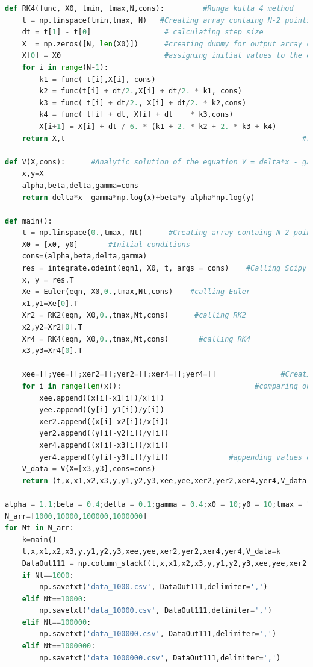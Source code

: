 \documentclass[12pt]{article}
\begin{document}
\begin{lstlisting}[language=Python, caption=Python example]
def RK4(func, X0, tmin, tmax,N,cons):         #Runga kutta 4 method
    t = np.linspace(tmin,tmax, N)   #Creating array containg N-2 points between tmin and tmax (Basically calculation points)
    dt = t[1] - t[0]                 # calculating step size
    X  = np.zeros([N, len(X0)])      #creating dummy for output array containing x,y values
    X[0] = X0                        #assigning initial values to the output array
    for i in range(N-1):
        k1 = func( t[i],X[i], cons)
        k2 = func(t[i] + dt/2.,X[i] + dt/2. * k1, cons)
        k3 = func( t[i] + dt/2., X[i] + dt/2. * k2,cons)
        k4 = func( t[i] + dt, X[i] + dt    * k3,cons)
        X[i+1] = X[i] + dt / 6. * (k1 + 2. * k2 + 2. * k3 + k4)           #Updating values of the dummy array that we created 
    return X,t                                                       #returns array of updated values of X and array t

def V(X,cons):      #Analytic solution of the equation V = delta*x - gamma*ln(x)+beta*y-alpha*ln(y)   
    x,y=X
    alpha,beta,delta,gamma=cons
    return delta*x -gamma*np.log(x)+beta*y-alpha*np.log(y)

def main():
    t = np.linspace(0.,tmax, Nt)      #Creating array containg N-2 points between tmin and tmax (Basically calculation points)
    X0 = [x0, y0]       #Initial conditions
    cons=(alpha,beta,delta,gamma)
    res = integrate.odeint(eqn1, X0, t, args = cons)    #Calling Scipy's odeint function
    x, y = res.T
    Xe = Euler(eqn, X0,0.,tmax,Nt,cons)    #calling Euler
    x1,y1=Xe[0].T
    Xr2 = RK2(eqn, X0,0.,tmax,Nt,cons)      #calling RK2
    x2,y2=Xr2[0].T
    Xr4 = RK4(eqn, X0,0.,tmax,Nt,cons)       #calling RK4
    x3,y3=Xr4[0].T

    xee=[];yee=[];xer2=[];yer2=[];xer4=[];yer4=[]               #Creating empty lists for appending values of absolute error
    for i in range(len(x)):                               #comparing our results of Euler,RK2,RK4 with Scipy's ODEint for finding error
        xee.append((x[i]-x1[i])/x[i])
        yee.append((y[i]-y1[i])/y[i])
        xer2.append((x[i]-x2[i])/x[i])
        yer2.append((y[i]-y2[i])/y[i])
        xer4.append((x[i]-x3[i])/x[i])
        yer4.append((y[i]-y3[i])/y[i])              #appending values of absolute error
    V_data = V(X=[x3,y3],cons=cons)
    return (t,x,x1,x2,x3,y,y1,y2,y3,xee,yee,xer2,yer2,xer4,yer4,V_data)                 

alpha = 1.1;beta = 0.4;delta = 0.1;gamma = 0.4;x0 = 10;y0 = 10;tmax = 100
N_arr=[1000,10000,100000,1000000]
for Nt in N_arr:
    k=main()
    t,x,x1,x2,x3,y,y1,y2,y3,xee,yee,xer2,yer2,xer4,yer4,V_data=k
    DataOut111 = np.column_stack((t,x,x1,x2,x3,y,y1,y2,y3,xee,yee,xer2,yer2,xer4,yer4,V_data))
    if Nt==1000:
        np.savetxt('data_1000.csv', DataOut111,delimiter=',') 
    elif Nt==10000:
        np.savetxt('data_10000.csv', DataOut111,delimiter=',') 
    elif Nt==100000:
        np.savetxt('data_100000.csv', DataOut111,delimiter=',') 
    elif Nt==1000000:
        np.savetxt('data_1000000.csv', DataOut111,delimiter=',') 


\end{lstlisting}
\end{document}
